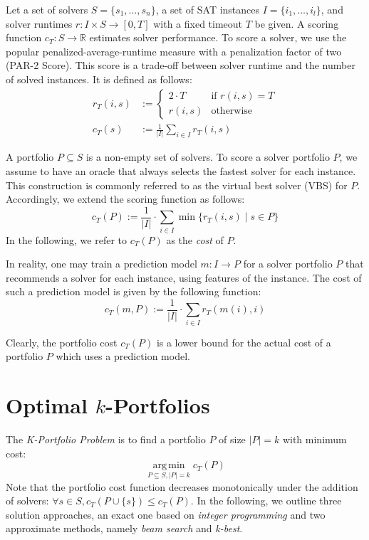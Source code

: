 \documentclass[runningheads]{llncs}
\DeclareMathOperator*{\argmin}{arg\,min}
\begin{document}
Let a set of solvers $S = \{s_1, \dots, s_n\}$, a set of SAT instances $I = \{i_1, \dots, i_l\}$, and solver runtimes $r: I \times S \rightarrow [0, T]$ with a fixed timeout $T$ be given.
A scoring function $c_T: S \rightarrow \mathbb{R}$ estimates solver performance. 
To score a solver, we use the popular penalized-average-runtime measure with a penalization factor of two (PAR-2 Score). 
This score is a trade-off between solver runtime and the number of solved instances.
It is defined as follows:%
\begin{align}
r_T(i,s) &:= \begin{cases}
	2 \cdot T & \text{if }r(i,s) = T\\
	r(i,s) & \text{otherwise}
\end{cases} \tag*{Penalized Runtimes}\\[.5em]
c_T(s) &:= \frac{1}{|I|} \sum_{i \in I}{r_T(i,s)} \tag*{PAR-2 Score}
\end{align}

A portfolio $P \subseteq S$ is a non-empty set of solvers.
To score a solver portfolio $P$, we assume to have an oracle that always selects the fastest solver for each instance. 
This construction is commonly referred to as the virtual best solver (VBS) for $P$. 
Accordingly, we extend the scoring function as follows:%
$$
	c_{T}(P) := \frac{1}{|I|} \cdot \sum\limits_{i \in I}{\min\{r_T(i,s) \mid s \in P\}}
$$
In the following, we refer to $c_{T}(P)$ as the \emph{cost} of $P$. 

In reality, one may train a prediction model $m : I \rightarrow P$ for a solver portfolio $P$ that recommends a solver for each instance, using features of the instance. 
The cost of such a prediction model is given by the following function:%
$$
	c_{T}(m,P) := \frac{1}{|I|} \cdot \sum\limits_{i \in I}{r_T(m(i),i)}
$$

Clearly, the portfolio cost $c_{T}(P)$ is a lower bound for the actual cost of a portfolio $P$ which uses a prediction model.

\section{Optimal \texorpdfstring{$k$}{k}-Portfolios} %
\label{sec:approach}

The \emph{K-Portfolio Problem} is to find a portfolio $P$ of size $|P| = k$ with minimum cost:%
$$
\argmin\limits_{P \subseteq S, |P| = k} c_{T}(P)
$$
Note that the portfolio cost function decreases monotonically under the addition of solvers: $\forall s \in S, c_{T}(P \cup \{s\}) \leq c_{T}(P)$. 
In the following, we outline three solution approaches, an exact one based on \emph{integer programming} and two approximate methods, namely \emph{beam search} and \emph{k-best}. 
\end{document}
